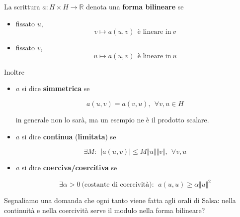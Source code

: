 \documentclass[10pt,a4paper,twoside,openright]{book}
\begin{document}
\begin{definition}
	La scrittura $a:H\times H\rightarrow \mathbb{R}$ denota una \textbf{forma bilineare} se
	\begin{itemize}
		\item fissato $u$,\begin{equation*}
		      v\mapsto a(u,v) \ \ \text{è lineare in} \ v
		\end{equation*}
		\item fissato $v$,\begin{equation*}
		      u\mapsto a(u,v) \ \ \text{è lineare in} \ u
		\end{equation*}
	\end{itemize}
\end{definition}
\begin{definition}
	Inoltre
	\begin{itemize}
		\item $a$ si dice \textbf{simmetrica} se
		      
		      \begin{equation*}
		      	a(u,v) =a(v,u),\ \ \forall v,u\in H
		      \end{equation*}
		      
		      in generale non lo sarà, ma un esempio ne è il prodotto scalare.
		\item $a$ si dice \textbf{continua} (\textbf{limitata}) se
		      
		      \begin{equation*}
		      	\exists M:\ \ | a(u,v)| \leqslant M\Vert u\Vert \Vert v\Vert,\ \ \forall v,u
		      \end{equation*}
		\item $a$ si dice \textbf{coerciva/coercitiva} se
		      
		      \begin{equation*}
		      	\exists \alpha  >0\ \text{(costante di coercività)} :\ \ a(u,u) \geqslant \alpha \Vert u\Vert ^{2}
		      \end{equation*}
	\end{itemize}
\end{definition}
Segnaliamo una domanda che ogni tanto viene fatta agli orali di Salsa: nella continuità e nella coercività serve il modulo nella forma bilineare?
\end{document}
